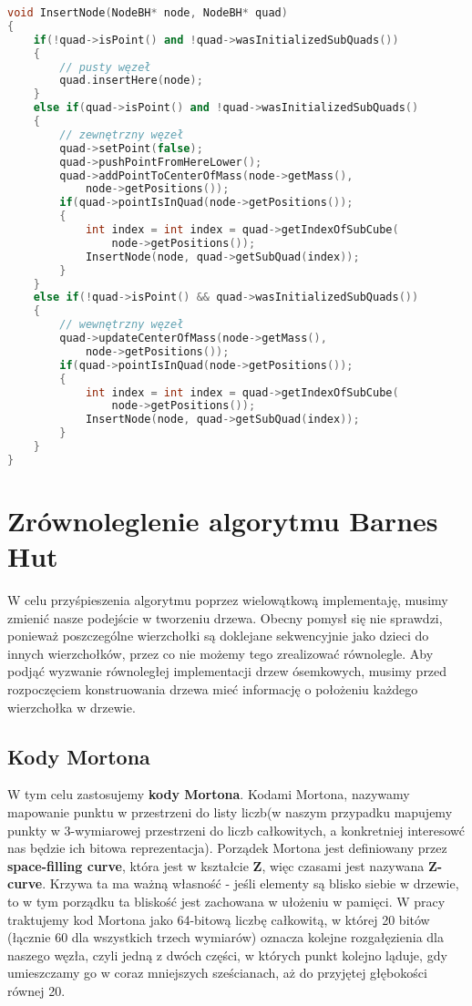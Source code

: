 \documentclass[14pt,twoside,a4paper]{article}
\theoremstyle{definition}
\begin{document}
\bigskip
{}
\begin{lstlisting}[language=C++, frame=single, framerule=2pt, caption=Wstawianie pojedynczego węzła do drzewa]
void InsertNode(NodeBH* node, NodeBH* quad) 
{
    if(!quad->isPoint() and !quad->wasInitializedSubQuads()) 
    {
        // pusty węzeł
        quad.insertHere(node);
    }
    else if(quad->isPoint() and !quad->wasInitializedSubQuads()
    {
        // zewnętrzny węzeł
        quad->setPoint(false);
        quad->pushPointFromHereLower();
        quad->addPointToCenterOfMass(node->getMass(), 
            node->getPositions());
        if(quad->pointIsInQuad(node->getPositions());
        {
            int index = int index = quad->getIndexOfSubCube(
                node->getPositions());
            InsertNode(node, quad->getSubQuad(index));
        }
    }
    else if(!quad->isPoint() && quad->wasInitializedSubQuads())
    {
        // wewnętrzny węzeł
        quad->updateCenterOfMass(node->getMass(), 
            node->getPositions());
        if(quad->pointIsInQuad(node->getPositions());
        {
            int index = int index = quad->getIndexOfSubCube(
                node->getPositions());
            InsertNode(node, quad->getSubQuad(index));
        }
    }
}
\end{lstlisting}

\section{\LARGE Zrównoleglenie algorytmu Barnes Hut}

W celu przyśpieszenia algorytmu poprzez wielowątkową implementaję, musimy zmienić nasze podejście w tworzeniu drzewa. Obecny pomysł się nie sprawdzi, ponieważ poszczególne wierzchołki są doklejane sekwencyjnie jako dzieci do innych wierzchołków, przez co nie możemy tego zrealizować równolegle.
Aby podjąć wyzwanie równoległej implementacji drzew ósemkowych, musimy przed rozpoczęciem konstruowania drzewa mieć informację o położeniu każdego wierzchołka w drzewie.

\subsection{\Large Kody Mortona}
W tym celu zastosujemy \textbf{kody Mortona}.
Kodami Mortona, nazywamy mapowanie punktu w przestrzeni do listy liczb(w naszym przypadku mapujemy punkty w 3-wymiarowej przestrzeni do liczb całkowitych, a konkretniej interesowć nas będzie ich bitowa reprezentacja).
Porządek Mortona jest definiowany przez \textbf{space-filling curve}, która jest w kształcie \textbf{Z}, więc czasami jest nazywana \textbf{Z-curve}. Krzywa ta ma ważną własność - jeśli elementy są blisko siebie w drzewie, to w tym porządku ta bliskość jest zachowana w ułożeniu w pamięci. W pracy traktujemy kod Mortona jako 64-bitową liczbę całkowitą, w której 20 bitów (łącznie 60 dla wszystkich trzech wymiarów) oznacza kolejne rozgałęzienia dla naszego węzła, czyli jedną z dwóch części, w których punkt kolejno ląduje, gdy umieszczamy go w coraz mniejszych sześcianach, aż do przyjętej głębokości równej 20.
\end{document}
